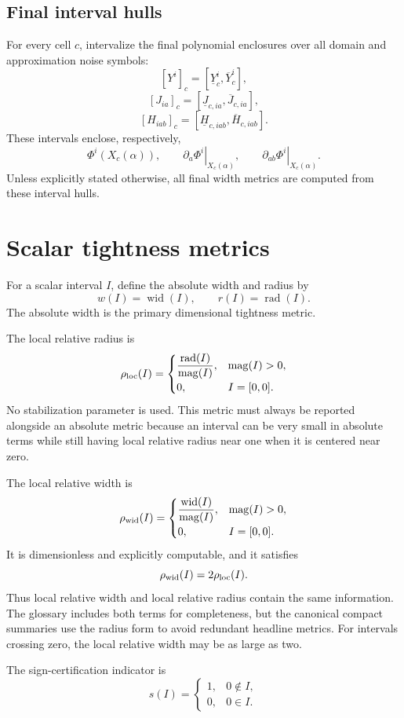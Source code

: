 \documentclass[11pt]{article}
\newcommand{\rad}{\operatorname{rad}}
\newcommand{\wid}{\operatorname{wid}}
\newcommand{\magI}{\operatorname{mag}}
\begin{document}
\subsection{Final interval hulls}

For every cell \(c\), intervalize the final polynomial enclosures over all
domain and approximation noise symbols:
\[
 [Y^i]_c=[\underline Y_c^i,\overline Y_c^i],
\]
\[
 [J_{ia}]_c=[\underline J_{c,ia},\overline J_{c,ia}],
\]
\[
 [H_{iab}]_c=[\underline H_{c,iab},\overline H_{c,iab}].
\]
These intervals enclose, respectively,
\[
 \Phi^i(X_c(\alpha)),\qquad
 \left.\partial_a\Phi^i\right|_{X_c(\alpha)},\qquad
 \left.\partial_{ab}\Phi^i\right|_{X_c(\alpha)}.
\]
Unless explicitly stated otherwise, all final width metrics are computed from
these interval hulls.

\section{Scalar tightness metrics}

For a scalar interval \(I\), define the absolute width and radius by
\[
 w(I)=\wid(I),\qquad r(I)=\rad(I).
\]
The absolute width is the primary dimensional tightness metric.

The local relative radius is
\[
 \rho_{\rm loc}(I)=
 \begin{cases}
  \dfrac{\rad(I)}{\magI(I)},&\magI(I)>0,\\[2mm]
  0,&I=[0,0].
 \end{cases}
\]
No stabilization parameter is used.  This metric must always be reported
alongside an absolute metric because an interval can be very small in absolute
terms while still having local relative radius near one when it is centered
near zero.

The local relative width is
\[
 \rho_{\rm wid}(I)=
 \begin{cases}
  \dfrac{\wid(I)}{\magI(I)},&\magI(I)>0,\\[2mm]
  0,&I=[0,0].
 \end{cases}
\]
It is dimensionless and explicitly computable, and it satisfies
\[
 \rho_{\rm wid}(I)=2\rho_{\rm loc}(I).
\]
Thus local relative width and local relative radius contain the same
information.  The glossary includes both terms for completeness, but the
canonical compact summaries use the radius form to avoid redundant headline
metrics.  For intervals crossing zero, the local relative width may be as large
as two.

The sign-certification indicator is
\[
 s(I)=
 \begin{cases}
  1,&0\notin I,\\
  0,&0\in I.
 \end{cases}
\]
\end{document}

